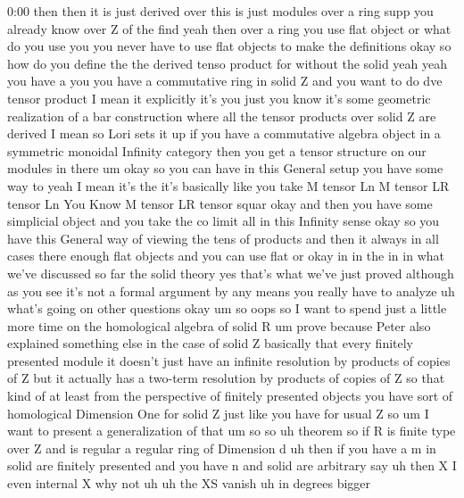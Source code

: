 \begin{unfinished}{0:00}
then  then  it  is  just  derived  over  this
is  just  modules  over  a  ring  supp  you
already  know  over  Z  of  the  find  yeah
then  over  a  ring  you  use  flat  object  or
what  do  you  use  you  you  never  have  to
use  flat  objects  to  make  the  definitions
okay  so  how  do  you  define  the  the
derived  tenso  product  for  without  the
solid  yeah  yeah  you  have  a  you  you  have
a  commutative  ring  in  solid  Z  and  you
want  to  do  dve  tensor  product  I  mean  it
explicitly  it's  you  just  you  know  it's
some  geometric  realization  of  a  bar
construction  where  all  the  tensor
products  over  solid  Z  are  derived  I  mean
so  Lori  sets  it  up  if  you  have  a
commutative  algebra  object  in  a
symmetric  monoidal  Infinity  category
then  you  get  a  tensor  structure  on  our
modules  in  there
um  okay  so  you  can  have  in  this  General
setup  you  have  some  way
to  yeah  I  mean  it's  the  it's  basically
like  you  take  M  tensor  Ln  M  tensor  LR
tensor  Ln  You  Know  M  tensor  LR  tensor
squar
okay  and  then  you  have  some  simplicial
object  and  you  take  the  co  limit  all  in
this  Infinity
sense  okay  so  you  have  this  General  way
of  viewing  the  tens  of  products  and  then
it  always  in  all  cases  there  enough  flat
objects  and  you  can  use  flat  or  okay  in
in  the  in  in  what  we've  discussed  so  far
the  solid  theory  yes  that's  what  we've
just  proved  although  as  you  see  it's  not
a  formal  argument  by  any  means  you
really  have  to  analyze  uh  what's  going
on
other
questions
okay  um
so  oops  so  I  want  to  spend  just  a  little
more  time  on  the  homological  algebra  of
solid  R
um  prove  because  Peter  also  explained
something  else  in  the  case  of  solid  Z
basically  that  every  finitely  presented
module  it  doesn't  just  have  an  infinite
resolution  by  products  of  copies  of  Z
but  it  actually  has  a  two-term
resolution  by  products  of  copies  of  Z  so
that  kind  of  at  least  from  the
perspective  of  finitely  presented
objects  you  have  sort  of  homological
Dimension  One  for  solid  Z  just  like  you
have  for  usual  Z  so  um  I  want  to  present
a  generalization  of
that  um
so
so  uh  theorem  so  if  R  is  finite
type  over  Z  and  is
regular  a  regular  ring  of  Dimension
d  uh  then  if  you  have  a  m  in  solid  are
finitely  presented  and  you  have  n  and
solid  are  arbitrary
say  uh  then  X  I  even  internal  X  why  not
uh
uh  the  XS  vanish  uh  in  degrees  bigger

\end{unfinished}
